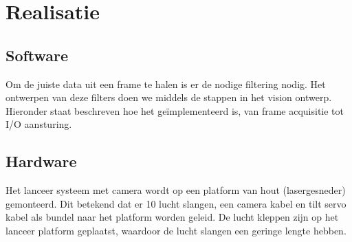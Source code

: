\chapter{Realisatie}
\label{chap:realisation}


\section{Software}

Om de juiste data uit een frame te halen is er de nodige filtering nodig.
Het ontwerpen van deze filters doen we middels de stappen in het vision ontwerp.
Hieronder staat beschreven hoe het geïmplementeerd is, van frame acquisitie tot
I/O aansturing.

% 
% 
% 
% 
% 
% 
% 
% 
% 
% 


\section{Hardware}
\label{sec:hardware}

Het lanceer systeem met camera wordt op een platform van hout (lasergesneder)
gemonteerd. Dit betekend dat er 10 lucht slangen, een camera kabel en tilt servo
kabel als bundel naar het platform worden geleid. De lucht kleppen zijn op het
lanceer platform geplaatst, waardoor de lucht slangen een geringe lengte hebben.










